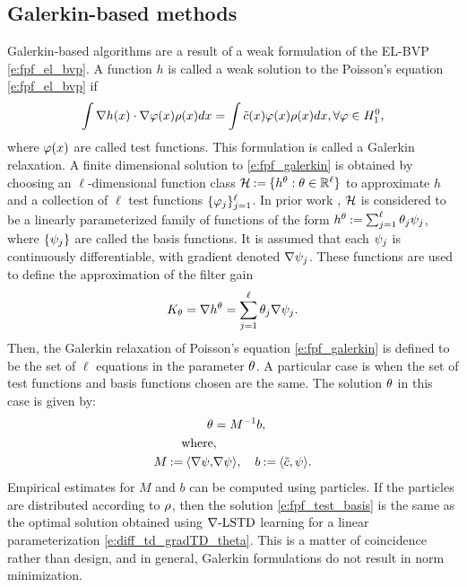 \subsection{Galerkin-based methods}
\label{s:galerkin}
Galerkin-based algorithms are a result of a weak formulation of the EL-BVP \eqref{e:fpf_el_bvp}. A function $h$ is called a weak solution to the Poisson's equation \eqref{e:fpf_el_bvp} if
\begin{equation}
\int \nabla h (x) \cdot \nabla \test(x)  \pr(x) dx = \int \tilc(x) \test(x) \pr(x) dx, \forall \test \in H^0_1,
\label{e:fpf_galerkin}
\end{equation}
where $\varphi(x)$ are called test functions. This formulation is called a Galerkin relaxation. 
A finite dimensional solution to \eqref{e:fpf_galerkin} is obtained by choosing an $\ell$-dimensional  function class
${\cal H}  \mathbin{:=} \{h^\theta : \theta \in \mathbb{R}^\ell\}$ to approximate $h$ and a collection of $\ell$ test functions $\{\varphi_j\}_{j=1}^{\ell}$. In prior work \cite{yanmehmey13,yanlaumehmey16}, ${\cal H}$ is considered to be a linearly parameterized family of functions of the form $h^\theta \mathbin{:=} \sum_{j=1}^{\ell}\theta_{j}\psi_{j} $, where $\{\psi_j\}$ are called the basis functions.  It is assumed that each $\psi_j$ is continuously differentiable,  with gradient denoted   $\nabla \psi_{j} $.
 These   functions are used to define the approximation of the filter gain
\begin{equation}
K_\param = \nabla h^\param= \sum_{j=1}^{\ell}\param_{j}\gradbasis_{j}.
\label{e:fpf_basis_galerkin}
\end{equation}
Then, the Galerkin relaxation of Poisson's equation \eqref{e:fpf_galerkin} is defined to be the set of $\ell$ equations in the parameter $\theta$. A particular case is when the set of test functions and basis functions chosen are the same. The solution $\theta$ in this case is given by:
\begin{equation}
\begin{aligned}
\param & = M^{-1} b, \\
\text{where}&,\\ 
M \eqdef \langle \gradbasis, &\gradbasis \rangle, \quad b \eqdef \langle \tilc, \basis \rangle.
\label{e:fpf_test_basis}
\end{aligned}
\end{equation}
Empirical estimates for $M$ and $b$ can be computed using particles. If the particles are distributed according to $\rho$, then the solution \eqref{e:fpf_test_basis} is the same as the optimal solution obtained using $\nabla\text{-LSTD}$ learning for a linear parameterization \eqref{e:diff_td_gradTD_theta}. This is a matter of coincidence rather than design, and in general, Galerkin formulations do not result in norm minimization. 

